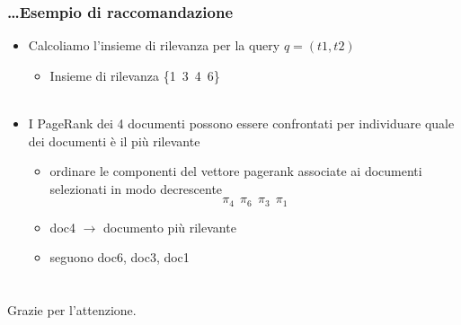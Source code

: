 \documentclass{beamer}
\begin{document}
\begin{frame}
	\frametitle{\dots Esempio di raccomandazione}
\begin{itemize}
\item Calcoliamo l'insieme di rilevanza per la query $q=(t1,t2)$
\begin{itemize}
	\item Insieme di rilevanza \{1~3~4~6\} \\~\\
\end{itemize}
\item I PageRank dei 4 documenti possono essere confrontati per individuare quale dei documenti è il più rilevante
\begin{itemize}
	\item ordinare le componenti del vettore pagerank associate ai documenti selezionati in modo decrescente
	$$\pi_4~~\pi_6~~\pi_3~~\pi_1$$
	\item doc4 $\longrightarrow$ documento più rilevante
	\item seguono doc6, doc3, doc1
\end{itemize}
\end{itemize}
\end{frame}
\section{}
\begin{frame}
\begin{center}
Grazie per l'attenzione.
\end{center}
\end{frame}
\end{document}
